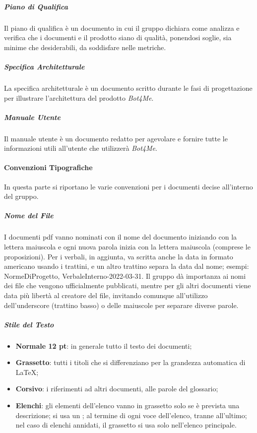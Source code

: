 \subparagraph*{Piano di Qualifica} \hfill \break
Il piano di qualifica è un documento in cui il gruppo dichiara come analizza e verifica che i documenti e 
il prodotto siano di qualità, ponendosi soglie, sia minime che desiderabili, da soddisfare nelle metriche.

\subparagraph*{Specifica Architetturale} \hfill \break
La specifica architetturale è un documento scritto durante le fasi di progettazione per illustrare 
l'architettura del prodotto \emph{Bot4Me}.

\subparagraph*{Manuale Utente} \hfill \break
Il manuale utente è un documento redatto per agevolare e fornire tutte le informazioni utili all'utente che 
utilizzerà \emph{Bot4Me}.

\paragraph{Convenzioni Tipografiche} 
In questa parte si riportano le varie convenzioni per i documenti decise all'interno del gruppo.
\subparagraph*{Nome del File}  \hfill \break
I documenti pdf vanno nominati con il nome del documento iniziando con la lettera maiuscola 
e ogni nuova parola inizia con la lettera maiuscola (comprese le proposizioni). Per i verbali, in 
aggiunta, va scritta anche la data in formato americano usando i trattini, e un altro trattino separa la data 
dal nome; esempi: NormeDiProgetto, VerbaleInterno-2022-03-31. \newline
Il gruppo dà importanza ai nomi dei file che vengono ufficialmente pubblicati, mentre per gli 
altri documenti viene data più libertà al creatore del file, invitando comunque all'utilizzo 
dell'underscore (trattino basso) o delle maiuscole per separare diverse parole.

\subparagraph*{Stile del Testo}
\begin{itemize}
        \item \textbf{Normale 12 pt}: in generale tutto il testo dei documenti;
        \item \textbf{Grassetto}: tutti i titoli che si differenziano per la grandezza automatica di \LaTeX ;
        \item \textbf{Corsivo}: i riferimenti ad altri documenti, alle parole del glossario;
        \item \textbf{Elenchi}: gli elementi dell'elenco vanno in grassetto solo se è prevista una descrizione;
                                si usa un ; al termine di ogni voce dell'elenco, tranne all'ultimo; \\
                                nel caso di elenchi annidati, il grassetto si usa solo nell'elenco principale.
\end{itemize}

